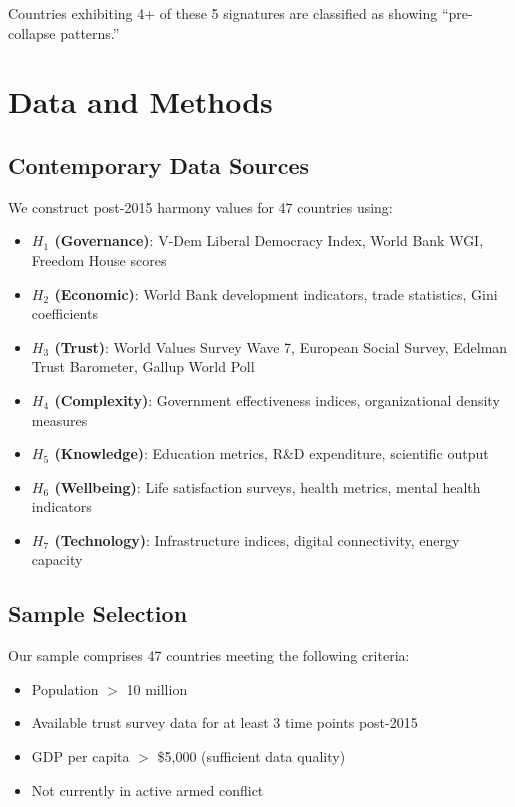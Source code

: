 \documentclass[11pt,a4paper]{article}
\begin{document}
Countries exhibiting 4+ of these 5 signatures are classified as showing ``pre-collapse patterns.''

\section{Data and Methods}

\subsection{Contemporary Data Sources}

We construct post-2015 harmony values for 47 countries using:

\begin{itemize}
\item \textbf{$H_1$ (Governance)}: V-Dem Liberal Democracy Index, World Bank WGI, Freedom House scores
\item \textbf{$H_2$ (Economic)}: World Bank development indicators, trade statistics, Gini coefficients
\item \textbf{$H_3$ (Trust)}: World Values Survey Wave 7, European Social Survey, Edelman Trust Barometer, Gallup World Poll
\item \textbf{$H_4$ (Complexity)}: Government effectiveness indices, organizational density measures
\item \textbf{$H_5$ (Knowledge)}: Education metrics, R\&D expenditure, scientific output
\item \textbf{$H_6$ (Wellbeing)}: Life satisfaction surveys, health metrics, mental health indicators
\item \textbf{$H_7$ (Technology)}: Infrastructure indices, digital connectivity, energy capacity
\end{itemize}

\subsection{Sample Selection}

Our sample comprises 47 countries meeting the following criteria:
\begin{itemize}
\item Population $>$ 10 million
\item Available trust survey data for at least 3 time points post-2015
\item GDP per capita $>$ \$5,000 (sufficient data quality)
\item Not currently in active armed conflict
\end{itemize}
\end{document}
